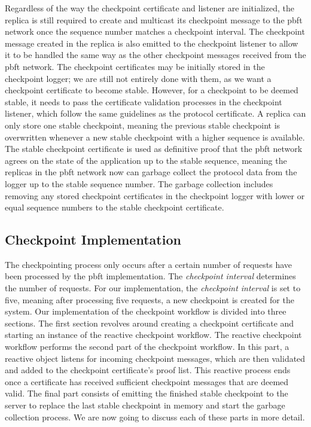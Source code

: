Regardless of the way the checkpoint certificate and listener are initialized, the replica is still required to create and multicast its checkpoint message to the \ac{pbft} network once the sequence number matches a checkpoint interval. The checkpoint message created in the replica is also emitted to the checkpoint listener to allow it to be handled the same way as the other checkpoint messages received from the \ac{pbft} network. The checkpoint certificates may be initially stored in the checkpoint logger; we are still not entirely done with them, as we want a checkpoint certificate to become stable. However, for a checkpoint to be deemed stable, it needs to pass the certificate validation processes in the checkpoint listener, which follow the same guidelines as the protocol certificate. A replica can only store one stable checkpoint, meaning the previous stable checkpoint is overwritten whenever a new stable checkpoint with a higher sequence is available. 
The stable checkpoint certificate is used as definitive proof that the \ac{pbft} network agrees on the state of the application up to the stable sequence, meaning the replicas in the \ac{pbft} network now can garbage collect the protocol data from the logger up to the stable sequence number. The garbage collection includes removing any stored checkpoint certificates in the checkpoint logger with lower or equal sequence numbers to the stable checkpoint certificate.
\fi

\subsection{Checkpoint Implementation}
\label{section:ImpCheckpointing}
The checkpointing process only occurs after a certain number of requests have been processed by the \ac{pbft} implementation. The \emph{checkpoint interval} determines the number of requests.
For our implementation, the \emph{checkpoint interval} is set to five, meaning after processing five requests, a new checkpoint is created for the system. Our implementation of the checkpoint workflow is divided into three sections. The first section revolves around creating a checkpoint certificate and starting an instance of the reactive checkpoint workflow. The reactive checkpoint workflow performs the second part of the checkpoint workflow. In this part, a reactive  object listens for incoming checkpoint messages, which are then validated and added to the checkpoint certificate’s proof list. This reactive process ends once a certificate has received sufficient checkpoint messages that are deemed valid. The final part consists of emitting the finished stable checkpoint to the server to replace the last stable checkpoint in memory and start the garbage collection process. We are now going to discuss each of these parts in more detail.

